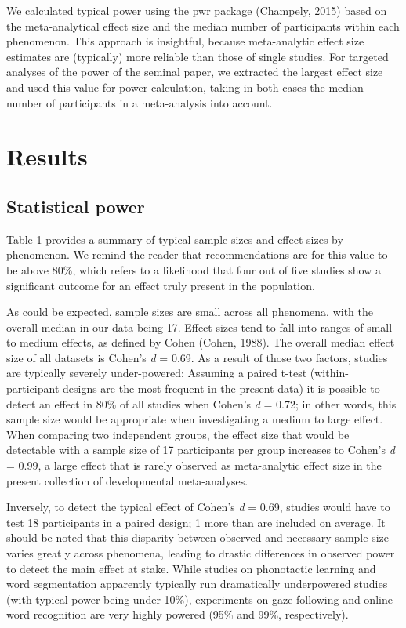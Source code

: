 \documentclass[english,floatsintext,man]{apa6}
\begin{document}
We calculated typical power using the pwr package (Champely, 2015) based
on the meta-analytical effect size and the median number of participants
within each phenomenon. This approach is insightful, because
meta-analytic effect size estimates are (typically) more reliable than
those of single studies. For targeted analyses of the power of the
seminal paper, we extracted the largest effect size and used this value
for power calculation, taking in both cases the median number of
participants in a meta-analysis into account.

\section{Results}\label{results}

\subsection{Statistical power}\label{statistical-power-1}

Table 1 provides a summary of typical sample sizes and effect sizes by
phenomenon. We remind the reader that recommendations are for this value
to be above 80\%, which refers to a likelihood that four out of five
studies show a significant outcome for an effect truly present in the
population.

As could be expected, sample sizes are small across all phenomena, with
the overall median in our data being 17. Effect sizes tend to fall into
ranges of small to medium effects, as defined by Cohen (Cohen, 1988).
The overall median effect size of all datasets is Cohen's \emph{d} =
0.69. As a result of those two factors, studies are typically severely
under-powered: Assuming a paired t-test (within-participant designs are
the most frequent in the present data) it is possible to detect an
effect in 80\% of all studies when Cohen's \emph{d} = 0.72; in other
words, this sample size would be appropriate when investigating a medium
to large effect. When comparing two independent groups, the effect size
that would be detectable with a sample size of 17 participants per group
increases to Cohen's \emph{d} = 0.99, a large effect that is rarely
observed as meta-analytic effect size in the present collection of
developmental meta-analyses.

Inversely, to detect the typical effect of Cohen's \emph{d} = 0.69,
studies would have to test 18 participants in a paired design; 1 more
than are included on average. It should be noted that this disparity
between observed and necessary sample size varies greatly across
phenomena, leading to drastic differences in observed power to detect
the main effect at stake. While studies on phonotactic learning and word
segmentation apparently typically run dramatically underpowered studies
(with typical power being under 10\%), experiments on gaze following and
online word recognition are very highly powered (95\% and 99\%,
respectively).
\end{document}
